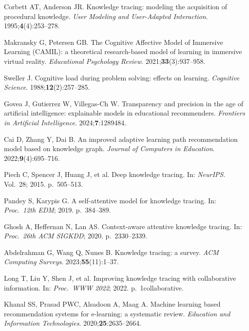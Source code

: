 \documentclass[ASNA,twocolumn]{USG} %
\begin{document}
\clearpage
\begin{thebibliography}{}

Corbett AT, Anderson JR.
Knowledge tracing: modeling the acquisition of procedural knowledge.
\textit{User Modeling and User-Adapted Interaction}.
1995;\textbf{4}(4):253--278.

Makransky G, Petersen GB.
The Cognitive Affective Model of Immersive Learning (CAMIL):
a theoretical research-based model of learning in immersive virtual reality.
\textit{Educational Psychology Review}.
2021;\textbf{33}(3):937--958.

Sweller J.
Cognitive load during problem solving: effects on learning.
\textit{Cognitive Science}.
1988;\textbf{12}(2):257--285.

Govea J, Gutierrez W, Villegas-Ch W.
Transparency and precision in the age of artificial intelligence:
explainable models in educational recommenders.
\textit{Frontiers in Artificial Intelligence}.
2024;\textbf{7}:1289484.

Cai D, Zhang Y, Dai B.
An improved adaptive learning path recommendation model based on
knowledge graph.
\textit{Journal of Computers in Education}.
2022;\textbf{9}(4):695--716.

Piech C, Spencer J, Huang J, et al.
Deep knowledge tracing.
In: \textit{NeurIPS}. Vol.~28; 2015. p.~505--513.

Pandey S, Karypis G.
A self-attentive model for knowledge tracing.
In: \textit{Proc.\ 12th EDM}; 2019. p.~384--389.

Ghosh A, Heffernan N, Lan AS.
Context-aware attentive knowledge tracing.
In: \textit{Proc.\ 26th ACM SIGKDD}; 2020. p.~2330--2339.

Abdelrahman G, Wang Q, Nunes B.
Knowledge tracing: a survey.
\textit{ACM Computing Surveys}.
2023;\textbf{55}(11):1--37.

Long T, Liu Y, Shen J, et al.
Improving knowledge tracing with collaborative information.
In: \textit{Proc.\ WWW 2022}; 2022. p.~1collaborative.

Khanal SS, Prasad PWC, Alsadoon A, Maag A.
Machine learning based recommendation systems for e-learning:
a systematic review.
\textit{Education and Information Technologies}.
2020;\textbf{25}:2635--2664.


\end{thebibliography}
\end{document}
